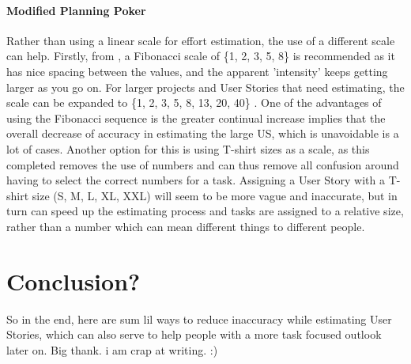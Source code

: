 \documentclass{scrartcl}
\begin{document}
    \paragraph{Modified Planning Poker}
    Rather than using a linear scale for effort estimation, the use of a different scale can help. Firstly, from \cite{cohn2005agile}, a Fibonacci scale of \{1, 2, 3, 5, 8\} is recommended as it has nice spacing between the values, and the apparent 'intensity' keeps getting larger as you go on. For larger projects and User Stories that need estimating, the scale can be expanded to \{1, 2, 3, 5, 8, 13, 20, 40\} \cite{cohn2005agile}. One of the advantages of using the Fibonacci sequence is the greater continual increase implies that the overall decrease of accuracy in estimating the large US, which is unavoidable is a lot of cases\cite{903173}.
    \newline
    Another option for this is using T-shirt sizes as a scale, as this completed removes the use of numbers and can thus remove all confusion around having to select the correct numbers for a task. Assigning a User Story with a T-shirt size (S, M, L, XL, XXL) will seem to be more vague and inaccurate, but in turn can speed up the estimating process and tasks are assigned to a relative size, rather than a number which can mean different things to different people.
    \section{Conclusion?}
    So in the end, here are sum lil ways to reduce inaccuracy while estimating User Stories, which can also serve to help people with a more task focused outlook later on. Big thank.
    i am crap at writing. :)
    
    
    \newpage
    \printbibliography
    
\end{document}
